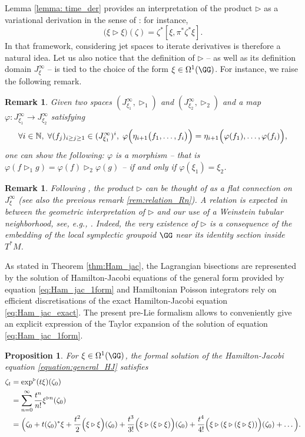 \documentclass[a4paper,11pt]{article}
\newtheorem{proposition}[theorem]{Proposition}
\newtheorem{remark}[theorem]{Remark}
\begin{document}
Lemma \ref{lemma: time_der} provides an interpretation of the product $\triangleright$ as a variational derivation in the sense of \cite{Olver93aol}: for instance,
\[ 
\bigl( \xi \triangleright \xi \bigr)(\zeta) = \zeta^*[\xi, \pi^*\zeta^*\xi].
\]
In that framework, considering jet spaces to iterate derivatives is therefore a natural idea. Let us also notice that the definition of $\triangleright$ -- as well as its definition domain $J_\xi^\infty$ -- is tied to the choice of the form $\xi \in \Omega^1(\GG)$. For instance, we raise the following remark.
\begin{remark}\label{rem:eval_morphism}
Given two spaces $(J_{\xi_1}^\infty,\triangleright_1)$ and $(J_{\xi_2}^\infty,\triangleright_2)$ and a map $\varphi\colon J_{\xi_1}^\infty \rightarrow J_{\xi_2}^\infty$ satisfying
\[
\forall i \in \mathbb{N}, \; \forall (f_j)_{i \geq j \geq 1} \in (J_{\xi_1}^{\infty})^i, \; \varphi\Bigl(\eta_{i+1}\bigl(f_1, \ldots, f_i \bigr)\Bigr)=\eta_{i+1}\Bigl(\varphi(f_1), \ldots, \varphi(f_i)  \Bigr),
\]
one can show the following: $\varphi$ is a morphism -- that is $\varphi(f\triangleright_1 g)= \varphi(f)\triangleright_2 \varphi(g)$ -- if and only if $\varphi(\xi_1)=\xi_2$.
\end{remark}

\begin{remark}
Following \cite{Ebrahimi15otl, Grong23pla}, the product $\triangleright$ can be thought of as a flat connection on $J_\xi^\infty$ (see also the previous remark \ref{rem:relation_Rn}). A relation is expected in between the geometric interpretation of $\triangleright$ and our use of a Weinstein tubular neighborhood, see, e.g., \cite{salazar2020}. Indeed, the very existence of $\triangleright$ is a consequence of the embedding of the local symplectic groupoid $\GG$ near its identity section inside $T^*M$.
\end{remark}


As stated in Theorem \ref{thm:Ham_jac}, the Lagrangian bisections are represented by the solution of Hamilton-Jacobi equations of the general form provided by equation \eqref{eq:Ham_jac_1form} and Hamiltonian Poisson integrators rely on efficient discretisations of the exact Hamilton-Jacobi equation \eqref{eq:Ham_jac_exact}.
The present pre-Lie formalism allows to conveniently give an explicit expression of the Taylor expansion of the solution of equation \eqref{eq:Ham_jac_1form}. 
\begin{proposition}
\label{proposition:HJ_expansion}
For $\xi\in \Omega^1(\GG)$, the formal solution of the Hamilton-Jacobi equation \eqref{equation:general_HJ} satisfies
\begin{align}
\label{equation:postLieexpansion}
\zeta_t&=\exp^\triangleright(t\xi)(\zeta_0)\\
&= \sum_{n=0}^\infty \frac{t^n}{n!}\xi^{\triangleright n}(\zeta_0) \nonumber\\ 
&=\Big(\zeta_0+t(\zeta_0)^*\xi+\frac{t^2}{2}\Bigl(\xi\triangleright \xi\Bigr)(\zeta_0)+\frac{t^3}{3!} \Bigl( \xi\triangleright(\xi\triangleright \xi) \Bigr)(\zeta_0)+\frac{t^4}{4!} \Bigl(\xi\triangleright(\xi\triangleright(\xi\triangleright \xi))\Bigr)(\zeta_0)+\dots\Big). \nonumber
\end{align}
\end{proposition}
\end{document}
